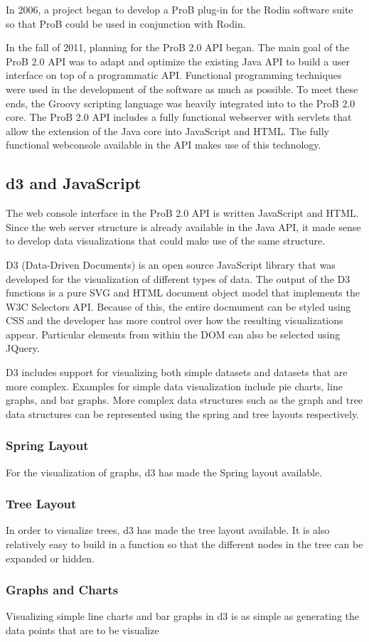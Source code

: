 In 2006, a project began to develop a ProB plug-in for the Rodin software suite so that ProB could be used in conjunction with Rodin. 

In the fall of 2011, planning for the ProB 2.0 API began.  The main goal of the ProB 2.0 API was to adapt and optimize the existing Java API to build a user interface on top of a programmatic API. Functional programming techniques were used in the development of the software as much as possible. To meet these ends, the Groovy scripting language was heavily integrated into to the ProB 2.0 core. The ProB 2.0 API includes a fully functional webserver with servlets that allow the extension of the Java core into JavaScript and HTML. The fully functional webconsole available in the API makes use of this technology.

\subsection{d3 and JavaScript}

The web console interface in the ProB 2.0 API is written JavaScript and HTML. Since the web server structure is already available in the Java API, it made sense to develop data visualizations that could make use of the same structure.

D3 (Data-Driven Documents) is an open source JavaScript library that was developed for the visualization of different types of data. The output of the D3 functions is a pure SVG and HTML document object model that implements the W3C Selectors API. Because of this, the entire docmument can be styled using CSS and the developer has more control over how the resulting visualizations appear. Particular elements from within the DOM can also be selected using JQuery. 

D3 includes support for visualizing both simple datasets and datasets that are more complex. Examples for simple data visualization include pie charts, line graphs, and bar graphs. More complex data structures such as the graph and tree data structures can be represented using the spring and tree layouts respectively.

\subsubsection{Spring Layout}

For the visualization of graphs, d3 has made the Spring layout available.

\subsubsection{Tree Layout}

In order to visualize trees, d3 has made the tree layout available. It is also relatively easy to build in a function so that the different nodes in the tree can be expanded or hidden.

\subsubsection{Graphs and Charts}

Visualizing simple line charts and bar graphs in d3 is as simple as generating the data points that are to be visualize
